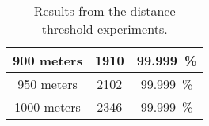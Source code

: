\begin{table}[H]
\begin{tabular}{|c|c|c|}
        900 meters         & 1910  & 99.999~\%   \\\hline %
        950 meters         & 2102  & 99.999~\%   \\\hline %
        1000 meters        & 2346  & 99.999~\%   \\\hline %
    \end{tabular}
    \caption{Results from the distance threshold experiments.}
    \label{table:cholesky:distance-threshold}
\end{table}







